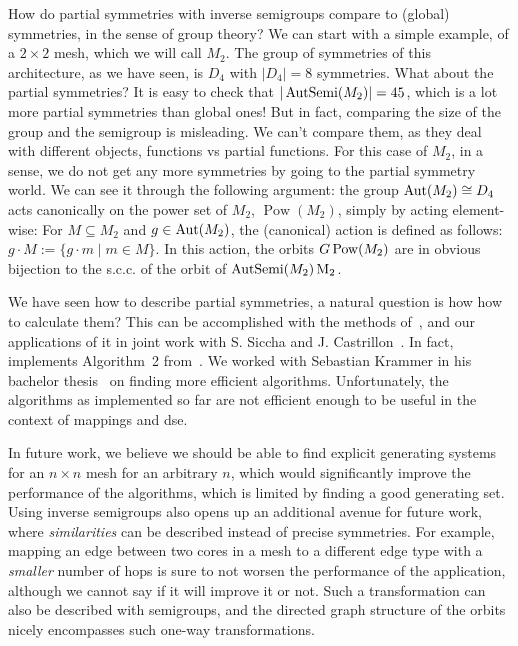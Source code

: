 How do partial symmetries with inverse semigroups compare to (global) symmetries, in the sense of group theory?
We can start with a simple example, of a $2\times 2$ mesh, which we will call $M_2$. The group of symmetries of this architecture, as we have seen, is $D_4$ with $|D_4| = 8$ symmetries.
What about the partial symmetries? It is easy to check that $|\operatorname{AutSemi}(M_2)| = 45$, which is a lot more partial symmetries than global ones! But in fact, comparing the size of the group and the semigroup is misleading.
We can't compare them, as they deal with different objects, functions vs partial functions. For this case of $M_2$, in a sense, we do not get any more symmetries by going to the partial symmetry world.
We can see it through the following argument: the group $\operatorname{Aut}(M_2) \cong D_4$ acts canonically on the power set of $M_2$, $\operatorname{Pow}(M_2)$, simply by acting element-wise:
For $M \subseteq M_2$ and $g \in \operatorname{Aut}(M_2)$, the (canonical) action is defined as follows: $g \cdot M := \{ g \cdot m \mid m \in M \}$.
In this action, the orbits $G \\ \operatorname{Pow}(M_2)$ are in obvious bijection to the s.c.c. of the orbit of $\operatorname{AutSemi}(M_2) \\ \operatorname{M_2}$.

We have seen how to describe partial symmetries, a natural question is how how to calculate them?
This can be accomplished with the methods of~\cite{east2019semigroups}, and our applications of it in joint work with S. Siccha and J. Castrillon~\cite{goens_taco17}.
In fact, \mpsym implements Algorithm~2 from~\cite{goens_taco17}.
We worked with Sebastian Krammer in his bachelor thesis~\cite{krammer_bachelor} on finding more efficient algorithms. 
Unfortunately, the algorithms as implemented so far are not efficient enough to be useful in the context of mappings and \ac{dse}.

In future work, we believe we should be able to find explicit generating systems for an $n \times n$ mesh for an arbitrary $n$, which would significantly improve the performance of the algorithms, which is limited by finding a good generating set.
Using inverse semigroups also opens up an additional avenue for future work, where \emph{similarities} can be described instead of precise symmetries. 
For example, mapping an edge between two cores in a mesh to a different edge type with a \emph{smaller} number of hops is sure to not worsen the performance of the application, although we cannot say if it will improve it or not.
Such a transformation can also be described with semigroups, and the directed graph structure of the orbits nicely encompasses such one-way transformations.